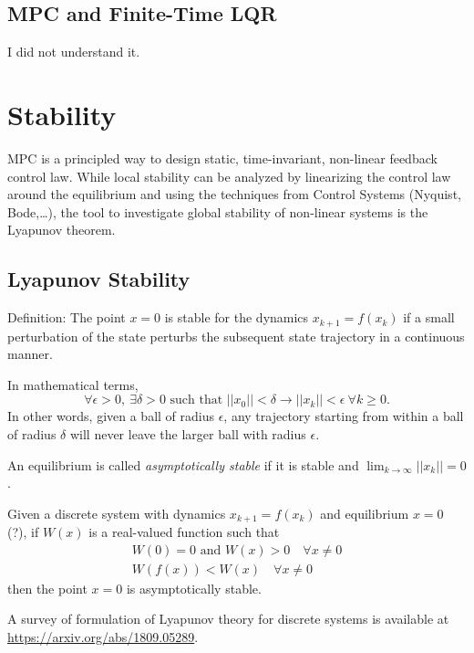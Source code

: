 \subsection{MPC and Finite-Time LQR}
\label{sec:MPC-finite-time-LQR}

I did not understand it.


\section{Stability}
\label{sec:mpc-stability}

MPC is a principled way to design static, time-invariant, non-linear feedback control law. While local stability can be analyzed by linearizing the control law around the equilibrium and using the techniques from Control Systems (Nyquist, Bode,\ldots), the tool to investigate global stability of non-linear systems is the Lyapunov theorem.

\subsection{Lyapunov Stability}
\label{sec:lyapunov-stability}

Definition: The point $x=0$ is stable for the dynamics $x_{k+1} = f(x_k)$ if a small perturbation of the state perturbs the subsequent state trajectory in a continuous manner.

In mathematical terms,
\begin{equation}
  \label{eq:lyapunov-stability-stable-equilibrium}
  \forall \epsilon > 0,\ \exists \delta > 0 \text{ such that } ||x_0|| < \delta \rightarrow ||x_k|| < \epsilon\ \forall k \ge 0.
\end{equation}
In other words, given a ball of radius $\epsilon$, any trajectory starting from within a ball of radius $\delta$ will never leave the larger ball with radius $\epsilon$.

An equilibrium is called \emph{asymptotically stable} if it is stable and $\lim_{k\rightarrow \infty} ||x_k||=0$.

\begin{theorem}
  \label{th:lyapunov}
  Given a discrete system with dynamics $x_{k+1} = f(x_k)$ and equilibrium $x=0$ (?), if $W(x)$ is a real-valued function such that
  \begin{align*}
    W(0)=0 \text{ and } W(x)>0\quad \forall x\neq 0 \\
    W(f(x)) < W(x)\quad \forall x\neq 0
  \end{align*}
  then the point $x=0$ is asymptotically stable.
\end{theorem}
A survey of formulation of Lyapunov theory for discrete systems is available at \url{https://arxiv.org/abs/1809.05289}.

